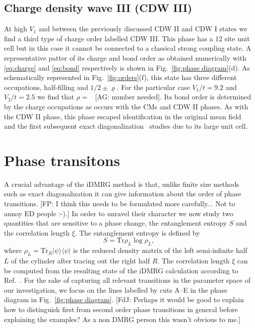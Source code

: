 \documentclass[aps,prx,10pt,twocolumn,floatfix,superscriptaddress,showpacs,numerical,footinbib]{revtex4-1}
\newcommand{\ket}[1]{| #1 \rangle}
\newcommand{\bra}[1]{\langle #1 |}
\newcommand{\noteAG}[1]{{\color{blue} [AG: #1]}}
\newcommand{\noteFP}[1]{{\color{magenta} [FP: #1]}}
\newcommand{\noteFdJ}[1]{{\color{cyan} [FdJ: #1]}}
\begin{document}
\subsection{Charge density wave III (CDW III)}
%
At high $V_{1}$ and between the previously discussed CDW II and CDW I states
we find a third type of charge order labelled CDW III.
%
This phase has a 12 site unit cell but in this case it cannot be connected to a classical strong coupling state.
%
A representative patter of its charge and bond order as obtained numerically 
with \eqref{eq:charge} and \eqref{eq:bond} respectively
is shown in Fig.~\ref{fig:phase diagram}(d).
%
As schematically represented in Fig.~\ref{fig:orders}(f), this state has three 
different occupations, half-filling and $1/2\pm\varrho$.
%
For the particular case $V_{1}/t=9.2$ and $V_{2}/t=2.5$ we find that $\rho=$~\noteAG{number needed}.
%
Its bond order is determined by the charge occupations 
as occurs with the CMs and CDW II phases.
%
As with the CDW II phase, this phase escaped
identification in the original mean field~\cite{RQHZ08,WF10,GCC13} 
and the first subsequent exact diagonalization~\cite{GGNVC13,DH14,DCH14} studies 
due to its large unit cell.
%
 




\section{\label{sec:phasetransitions} Phase transitons}
%
A crucial advantage of the iDMRG method is that, unlike finite
size methods such as exact diagonalization it can give information about the order of phase transitions.\noteFP{I think this needs to be formulated more carefully... Not to annoy ED people :-).}
%
In order to unravel their character we now study two quantities that are sensitive
to a phase change, the entanglement entropy $S$ and the correlation length $\xi$.
%
The entanglement entropy is defined by
%
\begin{equation}
 S = \mathrm{Tr} \rho_L \log \rho_L,
\end{equation}
%
where $\rho_L = \mathrm{Tr}_R \ket{\psi}\bra{\psi}$ is the reduced density matrix of the left semi-infinite half $L$ of the cylinder after tracing out the right half $R$.
%
The correlation length $\xi$ can be computed from the resulting state of the iDMRG calculation according to Ref.~\cite{KZM13}.
%
For the sake of capturing all relevant transitions in the parameter space of our investigation, we focus on the lines labelled by cuts A--E in the phase diagram in Fig.~\ref{fig:phase diagram}.
%
\noteFdJ{Perhaps it would be good to explain how to distinguish first from second order phase transitions in general before explaining the examples? As a non DMRG person this wasn't obvious to me.}
\end{document}
